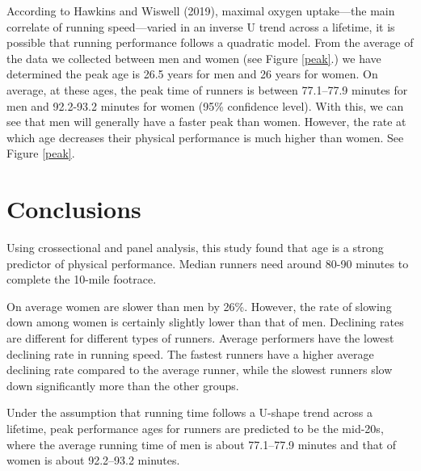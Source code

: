 \documentclass[12pt]{article}
\begin{document}


According to Hawkins and Wiswell (2019), maximal oxygen uptake---the main
correlate of running speed---varied in an inverse U trend across a lifetime,
it is possible that running performance follows a quadratic model.
From the average of the data we collected between men and women
(see Figure \ref{peak}.)
we have determined the peak age is 26.5 years for men and 26 years for women.
On average, at these ages, the peak time of runners is between 77.1--77.9
minutes for men and 92.2-93.2 minutes for women (95\% confidence level).
With this, we can see that men will generally have a faster peak than women. However, the rate at which age decreases their physical performance is much higher than women.
See Figure \ref{peak}.


\section*{Conclusions}

Using crossectional and panel analysis, this study found that age is a
strong predictor of physical performance.
Median runners need around 80-90 minutes to complete the 10-mile footrace.

On average women are slower than men by 26\%.
However, the rate of slowing down among women is certainly slightly lower
than that of men. Declining rates are different for different types of runners.
Average performers have the lowest declining rate in running speed.
The fastest runners have a higher average declining rate compared to the
average runner, while the slowest runners slow down significantly more than
the other groups.

Under the assumption that running time follows a U-shape trend across a
lifetime, peak performance ages for runners are predicted to be the mid-20s,
where the average running time of men is about 77.1--77.9 minutes and that of
women is about 92.2--93.2 minutes.
\end{document}
